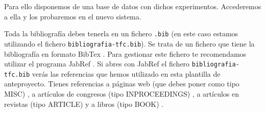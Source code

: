 \documentclass[12pt,oneside,a4paper]{article}
\begin{document}
Para ello disponemos de una base de datos con dichos experimentos. Accederemos a ella y los probaremos en el nuevo sistema.








Toda la bibliografía debes tenerla en un fichero \verb$.bib$ (en este caso estamos utilizando el fichero \verb$bibliografia-tfc.bib$). Se trata de un fichero que tiene la bibliografía en formato BibTex \cite{bibtex}. Para gestionar este fichero te recomendamos utilizar el programa JabRef \cite{jabref}. Si abres con JabRef el fichero \verb$bibliografia-tfc.bib$ verás las referencias que hemos utilizado en esta plantilla de anteproyecto. Tienes referencias a páginas web (que debes poner como tipo MISC) \cite{bibtex,jabref,wikibook}, a artículos de congresos (tipo INPROCEEDINGS) \cite{Lowe1999}, a artículos en revistas (tipo ARTICLE) \cite{Tuytelaars2008} y a libros (tipo BOOK) \cite{hartley2006}.
\end{document}
